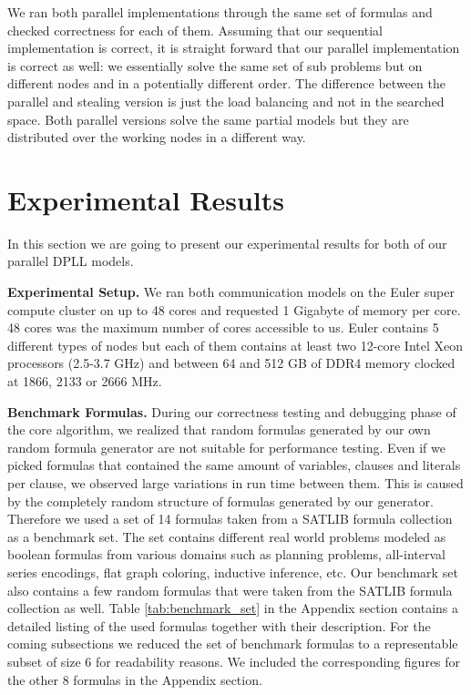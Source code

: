 \documentclass[letterpaper]{article}
\newcommand{\mypar}[1]{{\bf #1.}}
\begin{document}
We ran both parallel implementations through the same set of formulas and checked correctness for each of them.
Assuming that our sequential implementation is correct, it is straight forward that our parallel implementation is correct as well:
we essentially solve the same set of sub problems but on different nodes and in a potentially different order.
The difference between the parallel and stealing version is just the load balancing and not in the searched space.
Both parallel versions solve the same partial models but they are distributed over the working nodes in a different way.

\section{Experimental Results}\label{sec:exp}
In this section we are going to present our experimental results for both of our parallel DPLL models.

\mypar{Experimental Setup}
We ran both communication models on the Euler super compute cluster \cite{euler} on up to 48 cores and requested 1 Gigabyte of memory per core.
48 cores was the maximum number of cores accessible to us.
Euler contains 5 different types of nodes but each of them contains at least two 12-core Intel Xeon processors (2.5-3.7 GHz) and between 64 and 512 GB of DDR4 memory clocked at 1866, 2133 or 2666 MHz.

\mypar{Benchmark Formulas}
During our correctness testing and debugging phase of the core algorithm, we realized that random formulas generated by our own random formula generator are not suitable for performance testing.
Even if we picked formulas that contained the same amount of variables, clauses and literals per clause, we observed large variations in run time between them.
This is caused by the completely random structure of formulas generated by our generator.
Therefore we used a set of 14 formulas taken from a SATLIB formula collection as a benchmark set.
The set contains different real world problems modeled as boolean formulas from various domains such as planning problems,
all-interval series encodings, flat graph coloring, inductive inference, etc.
Our benchmark set also contains a few random formulas that were taken from the SATLIB formula collection as well.
Table \ref{tab:benchmark_set} in the Appendix section contains a detailed listing of the used formulas together with their description.
For the coming subsections we reduced the set of benchmark formulas to a representable subset of size 6 for readability reasons.
We included the corresponding figures for the other 8 formulas in the Appendix section.
\end{document}
